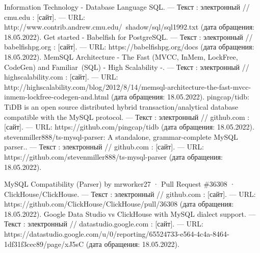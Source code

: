 \begin{thebibliography}{1}
 Information Technology - Database Language SQL. — Текст : электронный // cmu.edu : [сайт]. — URL: http://www.contrib.andrew.cmu.edu/~shadow/sql/sql1992.txt (дата обращения: 18.05.2022).
 Get started - Babelfish for PostgreSQL. — Текст : электронный // babelfishpg.org : [сайт]. — URL: https://babelfishpg.org/docs (дата обращения: 18.05.2022).
 MemSQL Architecture - The Fast (MVCC, InMem, LockFree, CodeGen) and Familiar (SQL) - High Scalability -. — Текст : электронный // highscalability.com : [сайт]. — URL: http://highscalability.com/blog/2012/8/14/memsql-architecture-the-fast-mvcc-inmem-lockfree-codegen-and.html (дата обращения: 18.05.2022).
 pingcap/tidb: TiDB is an open source distributed hybrid transaction/analytical database compatible with the MySQL protocol. — Текст : электронный // github.com : [сайт]. — URL: https://github.com/pingcap/tidb (дата обращения: 18.05.2022).
 stevenmiller888/ts-mysql-parser: A standalone, grammar-complete MySQL parser.. — Текст : электронный // github.com : [сайт]. — URL: https://github.com/stevenmiller888/ts-mysql-parser (дата обращения: 18.05.2022).

 MySQL Compatibility (Parser) by mrworker27 · Pull Request \#36308 · ClickHouse/ClickHouse. — Текст : электронный // github.com : [сайт]. — URL: https://github.com/ClickHouse/ClickHouse/pull/36308 (дата обращения: 18.05.2022).
 Google Data Studio vs ClickHouse with MySQL dialect support. — Текст : электронный // datastudio.google.com : [сайт]. — URL: https://datastudio.google.com/u/0/reporting/65524733-e564-4c4a-8464-1df31f3cec89/page/xJ5sC (дата обращения: 18.05.2022).
\end{thebibliography}
